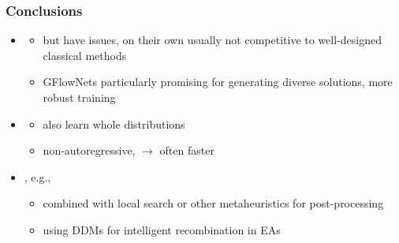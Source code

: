 \documentclass[aspectratio=1610]{beamer}
\newcommand{\important}[1]{{\color{green!60!black}#1}}
\begin{document}
\begin{frame}
	\frametitle{Conclusions}
	\medskip
	\begin{itemize}
		\itemsep3.5ex
		\item {}
		\begin{itemize}
			\item but \alert{have issues, on their own usually not competitive} to well-designed classical methods
			\item \important{GFlowNets particularly promising} for generating diverse solutions, more robust training
		\end{itemize}
		\item {}
		\begin{itemize}
			\item also \important{learn whole distributions}
			\item non-autoregressive, \(\rightarrow\) \important{often faster}
		\end{itemize} 
		\item {}, e.g.,
		\begin{itemize}
			\item combined with local search or other metaheuristics for post-processing
			\item using DDMs for intelligent recombination in EAs		
		\end{itemize}
	\end{itemize}
\end{frame}
\end{document}
